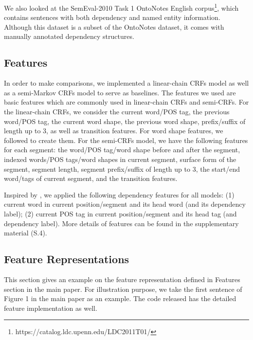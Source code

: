 We also looked at the SemEval-2010 Task 1 OntoNotes English corpus\footnote{https://catalog.ldc.upenn.edu/LDC2011T01/}, which contains sentences with both dependency and named entity information.
Although this dataset is a subset of the OntoNotes dataset, it comes with manually annotated dependency structures.





\subsection{Features}
In order to make comparisons, we implemented a linear-chain CRFs model as well as a semi-Markov CRFs model to serve as baselines. 
The features we used are basic features which are commonly used in linear-chain CRFs and semi-CRFs. 
For the linear-chain CRFs, we consider the current word/POS tag, the previous word/POS tag, the current word shape, the previous word shape, prefix/suffix of length up to 3, as well as transition features. 
For word shape features, we followed \cite{finkel2005exploring} to create them. 
For the semi-CRFs model, we have the following features for each segment: the word/POS tag/word shape before and after the segment, indexed words/POS tags/word shapes in current segment, surface form of the segment, segment length, segment prefix/suffix of length up to 3, the start/end word/tags of current segment, and the transition features. 

Inspired by \citet{ling2012fine}, we applied the following dependency features for all models: (1) current word in current position/segment and its head word (and its dependency label); (2) current POS tag in current position/segment and its head tag (and  dependency label). More details of features can be found in the supplementary material (S.4).


\subsection{Feature Representations}
This section gives an example on the feature representation defined in Features section in the main paper. 
For illustration purpose, we take the first sentence of Figure 1 in the main paper as an example. 
The code released has the detailed feature implementation as well.

